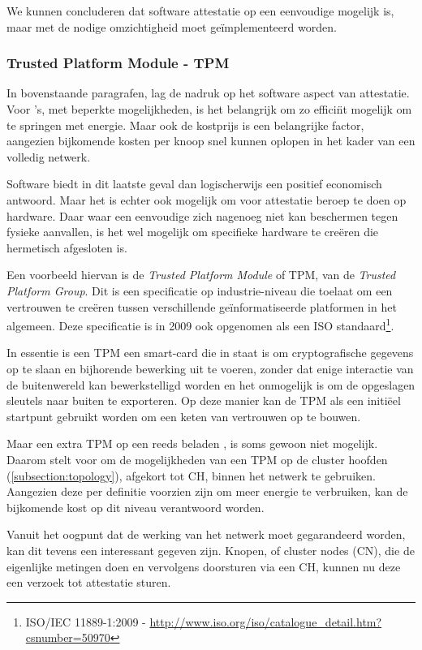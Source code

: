 We kunnen concluderen dat software attestatie op een eenvoudige \mcu mogelijk
is, maar met de nodige omzichtigheid moet ge\"implementeerd worden.

\subsubsection*{Trusted Platform Module - TPM}

In bovenstaande paragrafen, lag de nadruk op het software aspect van
attestatie. Voor \mcu's, met beperkte mogelijkheden, is het belangrijk om zo
effici\"nt mogelijk om te springen met energie. Maar ook de kostprijs is een
belangrijke factor, aangezien bijkomende kosten per knoop snel kunnen oplopen
in het kader van een volledig netwerk.

Software biedt in dit laatste geval dan logischerwijs een positief economisch
antwoord. Maar het is echter ook mogelijk om voor attestatie beroep te doen op
hardware. Daar waar een eenvoudige \mcu zich nagenoeg niet kan beschermen tegen
fysieke aanvallen, is het wel mogelijk om specifieke hardware te cre\"eren die
hermetisch afgesloten is.

Een voorbeeld hiervan is de \emph{Trusted Platform Module} of TPM, van de
\emph{Trusted Platform Group}. Dit is een specificatie op industrie-niveau die
toelaat om een vertrouwen te cre\"eren tussen verschillende ge\"informatiseerde
platformen in het algemeen. Deze specificatie is in 2009 ook opgenomen als een
ISO standaard\footnote{ISO/IEC 11889-1:2009 -
\url{http://www.iso.org/iso/catalogue_detail.htm?csnumber=50970}}.

In essentie is een TPM een smart-card die in staat is om cryptografische
gegevens op te slaan en bijhorende bewerking uit te voeren, zonder dat enige
interactie van de buitenwereld kan bewerkstelligd worden en het onmogelijk is
om de opgeslagen sleutels naar buiten te exporteren. Op deze manier kan de TPM
als een initi\"eel startpunt gebruikt worden om een keten van vertrouwen op te
bouwen.

Maar een extra TPM op een reeds beladen \mcu, is soms gewoon niet mogelijk.
Daarom stelt \cite{krauss2007detecting} voor om de mogelijkheden van een TPM op
de cluster hoofden (\ref{subsection:topology}), afgekort tot CH, binnen het
netwerk te gebruiken. Aangezien deze per definitie voorzien zijn om meer
energie te verbruiken, kan de bijkomende kost op dit niveau verantwoord worden.

Vanuit het oogpunt dat de werking van het netwerk moet gegarandeerd worden, kan
dit tevens een interessant gegeven zijn. Knopen, of cluster nodes (CN), die de
eigenlijke metingen doen en vervolgens doorsturen via een CH, kunnen nu deze
een verzoek tot attestatie sturen.

